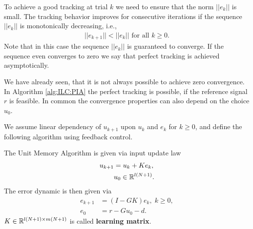 To achieve a good tracking at trial $k$ we need to ensure that the norm $||e_k||$ is small. 
The tracking behavior improves for consecutive iterations if the sequence $||e_k||$ is monotonically decreasing, i.e., 
\begin{align}
||e_{k+1} || < ||e_k|| \text{ for all } k \geq 0.
\end{align}
Note that in this case the sequence $||e_k||$ is guaranteed to converge. If the sequence even converges to zero we say that perfect tracking is achieved asymptotically.


We have already seen, that it is not always possible to achieve zero convergence. In Algorithm \ref{alg:ILC:PIA} the perfect tracking is possible, if the reference signal $r$ is feasible. In common the convergence properties can also depend on the choice $u_0$.



We assume linear dependency of $u_{k+1}$ upon $u_k$ and $e_k$ for $k \geq 0$, and define the following algorithm using feedback control. 
\begin{alg}
	\label{alg: unitMemory}
	The Unit Memory Algorithm is given via input update law 
	\begin{align}
	\label{eq:clPlant}
	\begin{split}
	u_{k+1} &= u_k + K e_k, \\
	& u_0 \in {\mathbb{R}}^{l (N+1)}.
	\end{split}
	\end{align}	 
	The error dynamic is then given via
	\begin{align}
	e _{k+1} &= (I - G K) e_{k}, \; k \geq 0,\\
	e_0 &= r -  Gu_0 -d.
	\end{align}
	$K \in {\mathbb{R}}^{l(N+1) \times m(N+1)}$ is called \textbf{learning matrix}. 
\end{alg}

